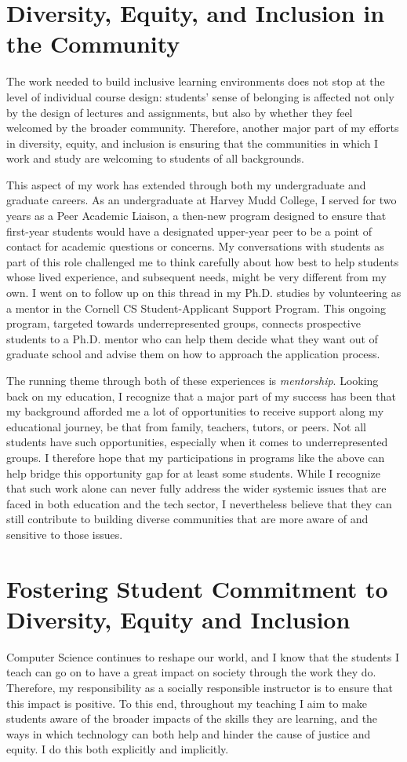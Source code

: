 \documentclass[12pt,letterpaper]{article}
\begin{document}
\section{Diversity, Equity, and Inclusion in the Community}
The work needed to build inclusive learning environments does not stop at the level of individual course design: students' sense of belonging is affected not only by the design of lectures and assignments, but also by whether they feel welcomed by the broader community.
Therefore, another major part of my efforts in diversity, equity, and inclusion is ensuring that the communities in which I work and study are welcoming to students of all backgrounds.

This aspect of my work has extended through both my undergraduate and graduate careers.
As an undergraduate at Harvey Mudd College, I served for two years as a Peer Academic Liaison, a then-new program designed to ensure that first-year students would have a designated upper-year peer to be a point of contact for academic questions or concerns.
My conversations with students as part of this role challenged me to think carefully about how best to help students whose lived experience, and subsequent needs, might be very different from my own.
I went on to follow up on this thread in my Ph.D. studies by volunteering as a mentor in the Cornell CS Student-Applicant Support Program.
This ongoing program, targeted towards underrepresented groups, connects prospective students to a Ph.D. mentor who can help them decide what they want out of graduate school and advise them on how to approach the application process.

The running theme through both of these experiences is \emph{mentorship}.
Looking back on my education, I recognize that a major part of my success has been that my background afforded me a lot of opportunities to receive support along my educational journey, be that from family, teachers, tutors, or peers.
Not all students have such opportunities, especially when it comes to underrepresented groups.
I therefore hope that my participations in programs like the above can help bridge this opportunity gap for at least some students.
While I recognize that such work alone can never fully address the wider systemic issues that are faced in both education and the tech sector, I nevertheless believe that they can still contribute to building diverse communities that are more aware of and sensitive to those issues.

\section{Fostering Student Commitment to Diversity, Equity and Inclusion}
Computer Science continues to reshape our world, and I know that the students I teach can go on to have a great impact on society through the work they do.
Therefore, my responsibility as a socially responsible instructor is to ensure that this impact is positive.
To this end, throughout my teaching I aim to make students aware of the broader impacts of the skills they are learning, and the ways in which technology can both help and hinder the cause of justice and equity. 
I do this both explicitly and implicitly.
\end{document}
